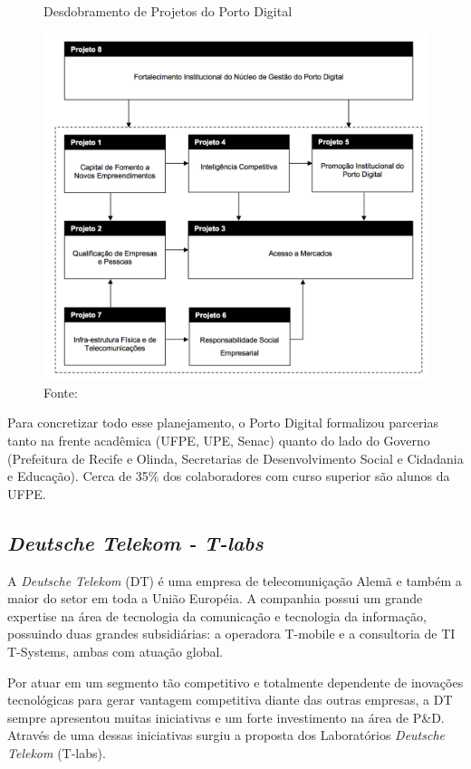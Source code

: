 \begin{figure}[h]
\caption{Desdobramento de Projetos do Porto Digital}
\centerline{\includegraphics[scale=0.5]{img/projetosPD}}
\label{fig:projetosPD}
\caption* {Fonte: }
\end{figure}

Para concretizar todo esse planejamento, o Porto Digital formalizou parcerias tanto na frente acadêmica (UFPE, UPE, Senac) quanto do lado do Governo (Prefeitura de Recife e Olinda, Secretarias de Desenvolvimento Social e Cidadania e Educação). Cerca de 35\% dos colaboradores com curso superior são alunos da UFPE.

\subsection{\textit{Deutsche Telekom - T-labs}}

A \textit{Deutsche Telekom} (DT) é uma empresa de telecomuniçação Alemã e também a maior do setor em toda a União Européia. A companhia possui um grande expertise na área de tecnologia da comunicação e tecnologia da informação, possuindo duas grandes subsidiárias: a operadora T-mobile e a consultoria de TI T-Systems, ambas com atuação global.

Por atuar em um segmento tão competitivo e totalmente dependente de inovações tecnológicas para gerar vantagem competitiva diante das outras empresas, a DT sempre apresentou muitas iniciativas e um forte investimento na área de P\&D. Através de uma dessas iniciativas surgiu a proposta dos Laboratórios \textit{Deutsche Telekom} (T-labs).

